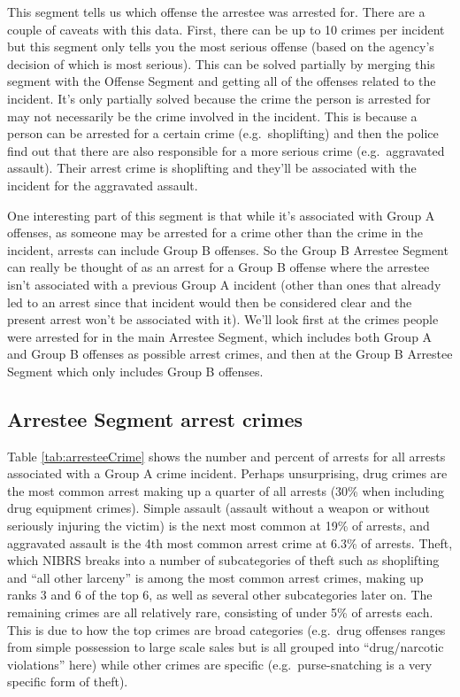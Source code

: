 \documentclass[
]{krantz}
\begin{document}
This segment tells us which offense the arrestee was
arrested for. There are a couple of caveats with this data.
First, there can be up to 10 crimes per incident but this
segment only tells you the most serious offense (based on
the agency's decision of which is most serious). This can be
solved partially by merging this segment with the Offense
Segment and getting all of the offenses related to the
incident. It's only partially solved because the crime the
person is arrested for may not necessarily be the crime
involved in the incident. This is because a person can be
arrested for a certain crime (e.g.~shoplifting) and then the
police find out that there are also responsible for a more
serious crime (e.g.~aggravated assault). Their arrest crime
is shoplifting and they'll be associated with the incident
for the aggravated assault.

One interesting part of this segment is that while it's
associated with Group A offenses, as someone may be arrested
for a crime other than the crime in the incident, arrests
can include Group B offenses. So the Group B Arrestee
Segment can really be thought of as an arrest for a Group B
offense where the arrestee isn't associated with a previous
Group A incident (other than ones that already led to an
arrest since that incident would then be considered clear
and the present arrest won't be associated with it). We'll
look first at the crimes people were arrested for in the
main Arrestee Segment, which includes both Group A and Group
B offenses as possible arrest crimes, and then at the Group
B Arrestee Segment which only includes Group B offenses.

\subsection{Arrestee Segment arrest
crimes}\label{arrestee-segment-arrest-crimes}

Table \ref{tab:arresteeCrime} shows the number and percent
of arrests for all arrests associated with a Group A crime
incident. Perhaps unsurprising, drug crimes are the most
common arrest making up a quarter of all arrests (30\% when
including drug equipment crimes). Simple assault (assault
without a weapon or without seriously injuring the victim)
is the next most common at 19\% of arrests, and aggravated
assault is the 4th most common arrest crime at 6.3\% of
arrests. Theft, which NIBRS breaks into a number of
subcategories of theft such as shoplifting and ``all other
larceny'' is among the most common arrest crimes, making up
ranks 3 and 6 of the top 6, as well as several other
subcategories later on. The remaining crimes are all
relatively rare, consisting of under 5\% of arrests each.
This is due to how the top crimes are broad categories
(e.g.~drug offenses ranges from simple possession to large
scale sales but is all grouped into ``drug/narcotic
violations'' here) while other crimes are specific
(e.g.~purse-snatching is a very specific form of theft).
\end{document}
